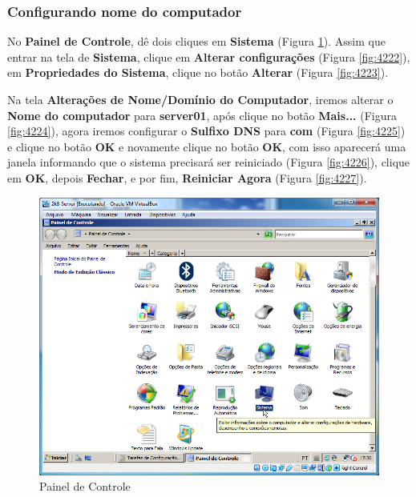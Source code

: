 \documentclass[10pt]{article}
\begin{document}
\subsubsection{Configurando nome do computador}
\par No \textbf{Painel de Controle}, dê dois cliques em \textbf{Sistema} (Figura \ref{fig:4221}). Assim que entrar na tela de \textbf{Sistema}, clique em \textbf{Alterar configurações} (Figura \ref{fig:4222}), em \textbf{Propriedades do Sistema}, clique no botão \textbf{Alterar} (Figura \ref{fig:4223}).
\par Na tela \textbf{Alterações de Nome/Domínio do Computador}, iremos alterar o \textbf{Nome do computador} para \textbf{server01}, após clique no botão \textbf{Mais...} (Figura \ref{fig:4224}), agora iremos configurar o \textbf{Sulfixo DNS} para \textbf{com} (Figura \ref{fig:4225}) e clique no botão \textbf{OK} e novamente clique no botão \textbf{OK}, com isso aparecerá uma janela informando que o sistema precisará ser reiniciado (Figura \ref{fig:4226}), clique em \textbf{OK}, depois \textbf{Fechar}, e por fim, \textbf{Reiniciar Agora} (Figura \ref{fig:4227}).
\begin{figure}[H]
    \centering
    \caption{Painel de Controle}
    \label{fig:4221}
    \includegraphics[width=\linewidth]{images/configuracao_windows/windows_server/008.png}
\end{figure}
\end{document}
